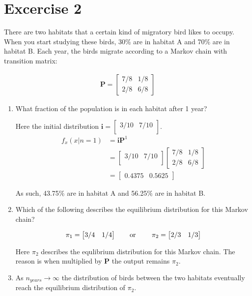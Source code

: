 \documentclass[12pt]{article}
\begin{document}
\section{Excercise 2}
There are two habitats that a certain kind of migratory bird likes to occupy. When you start 
studying these birds, 30\% are in habitat A and 70\% are in habitat B. Each year, the birds 
migrate according to a Markov chain with transition matrix:


\newcommand{\PITWO}{%
  \begin{bmatrix}
    2/3 & 1/3 \\
  \end{bmatrix}}

\newcommand{\PIONE}{%
  \begin{bmatrix}
    3/4 & 1/4 \\
  \end{bmatrix}}

\renewcommand{\ID}{%
  \begin{bmatrix}
    3/10 & 7/10 \\
  \end{bmatrix}}

\renewcommand{\TM}{%
  \begin{bmatrix}
    7/8 & 1/8 \\
    2/8 & 6/8
  \end{bmatrix}}

\begin{align*}
  \bm{P} = \TM
\end{align*}
\begin{enumerate}[label=(\alph*)]
  \item What fraction of the population is in each habitat after 1 year?
    
    Here the initial distribution $\bm{i}=\ID$.
    \begin{align*}
      f_x(x|n=1)&=\bm{i}\bm{P}^1\\
                &=\ID\TM\\
                &=
        \begin{bmatrix}
          0.4375 & 0.5625
        \end{bmatrix}
    \end{align*}
  
    As such, 43.75\% are in habitat A and 56.25\% are in habitat B.
  \item Which of the following describes the equilibrium distribution for this Markov chain?
  
    $$\pi_1=\PIONE \text{\qquad or \qquad} \pi_2=\PITWO$$

    Here $\pi_2$ describes the equlibrium distribution for this Markov chain. The reason is
    when multiplied by $\bm{P}$ the output remains $\pi_2$.

  \item As $n_{years}\to\infty$ the distribution of birds between the two habitats eventually
    reach the equilibrium distribution of $\pi_2$.
\end{enumerate}
\newpage
\end{document}
